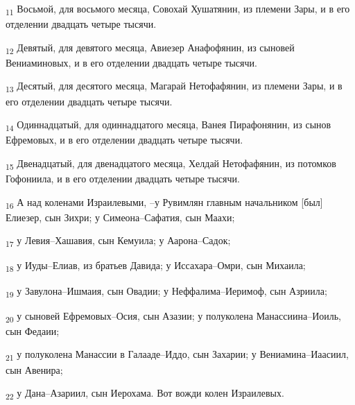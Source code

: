 \begin{tcolorbox}
\textsubscript{11} Восьмой, для восьмого месяца, Совохай Хушатянин, из племени Зары, и в его отделении двадцать четыре тысячи.
\end{tcolorbox}
\begin{tcolorbox}
\textsubscript{12} Девятый, для девятого месяца, Авиезер Анафофянин, из сыновей Вениаминовых, и в его отделении двадцать четыре тысячи.
\end{tcolorbox}
\begin{tcolorbox}
\textsubscript{13} Десятый, для десятого месяца, Магарай Нетофафянин, из племени Зары, и в его отделении двадцать четыре тысячи.
\end{tcolorbox}
\begin{tcolorbox}
\textsubscript{14} Одиннадцатый, для одиннадцатого месяца, Ванея Пирафонянин, из сынов Ефремовых, и в его отделении двадцать четыре тысячи.
\end{tcolorbox}
\begin{tcolorbox}
\textsubscript{15} Двенадцатый, для двенадцатого месяца, Хелдай Нетофафянин, из потомков Гофониила, и в его отделении двадцать четыре тысячи.
\end{tcolorbox}
\begin{tcolorbox}
\textsubscript{16} А над коленами Израилевыми, --у Рувимлян главным начальником [был] Елиезер, сын Зихри; у Симеона--Сафатия, сын Маахи;
\end{tcolorbox}
\begin{tcolorbox}
\textsubscript{17} у Левия--Хашавия, сын Кемуила; у Аарона--Садок;
\end{tcolorbox}
\begin{tcolorbox}
\textsubscript{18} у Иуды--Елиав, из братьев Давида; у Иссахара--Омри, сын Михаила;
\end{tcolorbox}
\begin{tcolorbox}
\textsubscript{19} у Завулона--Ишмаия, сын Овадии; у Неффалима--Иеримоф, сын Азриила;
\end{tcolorbox}
\begin{tcolorbox}
\textsubscript{20} у сыновей Ефремовых--Осия, сын Азазии; у полуколена Манассиина--Иоиль, сын Федаии;
\end{tcolorbox}
\begin{tcolorbox}
\textsubscript{21} у полуколена Манассии в Галааде--Иддо, сын Захарии; у Вениамина--Иаасиил, сын Авенира;
\end{tcolorbox}
\begin{tcolorbox}
\textsubscript{22} у Дана--Азариил, сын Иерохама. Вот вожди колен Израилевых.
\end{tcolorbox}

